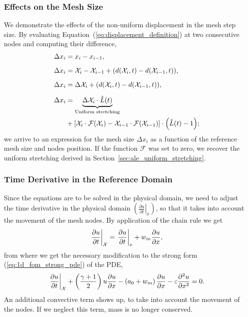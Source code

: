 \documentclass[../../thesis.tex]{subfiles}
\newcommand{\aleX}{\ensuremath{\mathcal{X}}}
\begin{document}
\subsubsection*{Effects on the Mesh Size}
We demonstrate the effects of the non-uniform displacement in the mesh step size.
By evaluating Equation~(\ref{eq:displacement_definition}) at two consecutive nodes
and computing their difference,
\begin{subequations}    
\begin{align}
    \Delta x_i &= x_i - x_{i-1},
    \\[2mm]
    \Delta x_i &= \aleX_i - \aleX_{i-1} + \qty(d\qty(\aleX_i, t) - d\qty(\aleX_{i-1}, t)),
    \\[2mm]
    \Delta x_i &= \Delta \aleX_i + \qty(d\qty(\aleX_i, t) - d\qty(\aleX_{i-1}, t)),
    \\[2mm]
    \Delta x_i &= 
    \underbrace{\Delta \aleX_i \cdot \hat{L}(t)}_{\text{Uniform stretching}}
    \nonumber\\
    &+\qty[\aleX_i \cdot \mathcal{F}\qty(\aleX_i)
    - \aleX_{i-1} \cdot \mathcal{F}\qty(\aleX_{i-1})] \cdot \qty(\hat{L}(t) - 1);
    \end{align}
\end{subequations}
we arrive to an expression for the mesh size $\Delta x_i$ 
as a function of the reference mesh size and nodes position.
If the function $\mathcal{F}$ was set to zero, 
we recover the uniform stretching derived in Section~\ref{sec:ale_uniform_stretching}.

\subsubsection{Time Derivative in the Reference Domain}
Since the equations are to be solved in the physical domain, 
we need to adjust the time derivative in the physical domain 
$\left(\left.\frac{\partial u}{\partial t}\right|_{x}\right)$, 
so that it takes into account the movement of the mesh nodes.
By application of the chain rule we get
\begin{equation}
    \left.\frac{\partial u}{\partial t}\right|_{\aleX} = 
    \left.\frac{\partial u}{\partial t}\right|_{x} + w_m \pdv{u}{x},
\end{equation}
from where we get the necessary modification to the strong form (\ref{eq:1d_fom_strong_pde}) of the PDE, 
\begin{equation}
    \left.\frac{\partial u}{\partial t}\right|_{\aleX} 
    + \left(\frac{\gamma+1}{2}\right) u \frac{\partial u}{\partial x} 
    - \left(a_0 + w_m\right)\frac{\partial u}{\partial x} 
    - \varepsilon \pdv[2]{u}{x} = 0.
\end{equation}
An additional convective term shows up, to take into account the movement of the nodes.
If we neglect this term, mass is no longer conserved.
\end{document}
